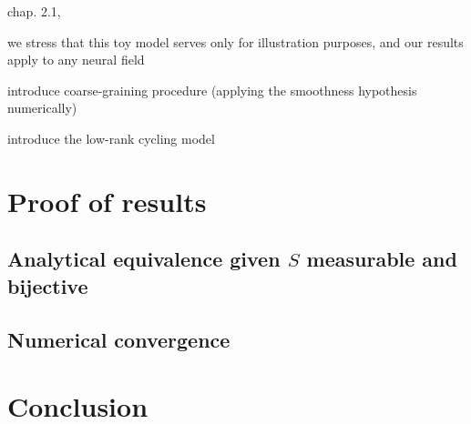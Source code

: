 \documentclass[NETN,manuscript]{stjour-new}
\begin{document}
chap. 2.1, 

we stress that this toy model serves only for illustration purposes, and our results apply to any neural field

introduce coarse-graining procedure (applying the smoothness hypothesis numerically)

introduce the low-rank cycling model

\section{Proof of results}

\subsection{Analytical equivalence given $S$ measurable and bijective}
\label{sec:proof-equivalence}

\subsection{Numerical convergence}

\section{Conclusion}

\acknowledgments


% 


\end{document}
